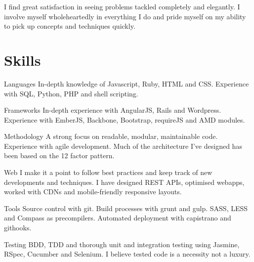 \documentclass[11pt,a4paper,sans]{moderncv}        %
\begin{document}
\makecvtitle

\small{I find great satisfaction in seeing problems tackled completely and elegantly. I involve myself wholeheartedly in everything I do and pride myself on my ability to pick up concepts and techniques quickly.}

\vspace{6pt}

\section{Skills}

\vspace{6pt}

\cvline
{\textcolor{light}{Languages}}
{In-depth knowledge of Javascript, Ruby, HTML and CSS. Experience with SQL, Python, PHP and shell scripting.}

\vspace{6pt}

\cvline
{\textcolor{light}{Frameworks}}
{In-depth experience with AngularJS, Rails and Wordpress. Experience with EmberJS, Backbone, Bootstrap, requireJS and AMD modules.}

\vspace{6pt}

\cvline
{\textcolor{light}{Methodology}}
{A strong focus on readable, modular, maintainable code. Experience with agile development. Much of the architecture I've designed has been based on the 12 factor pattern.}

\vspace{6pt}

\cvline
{\textcolor{light}{Web}}
{I make it a point to follow best practices and keep track of new developments and techniques. I have designed REST APIs, optimised webapps, worked with CDNs and mobile-friendly responsive layouts.}


\vspace{6pt}

\cvline
{\textcolor{light}{Tools}}
{Source control with git. Build processes with grunt and gulp. SASS, LESS and Compass as precompilers. Automated deployment with capistrano and githooks.}

\vspace{6pt}


\cvline
{\textcolor{light}{Testing}}
{BDD, TDD and thorough unit and integration testing using Jasmine, RSpec, Cucumber and Selenium. I believe tested code is a necessity not a luxury.}
\end{document}
